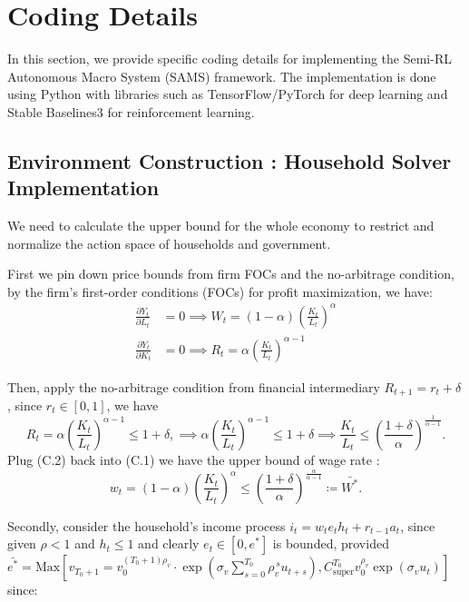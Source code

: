 \documentclass[11pt]{article}
\begin{document}
\section{Coding Details}

In this section, we provide specific coding details for implementing the Semi-RL Autonomous Macro System (SAMS) framework. The implementation is done using Python with libraries such as TensorFlow/PyTorch for deep learning and Stable Baselines3 for reinforcement learning.

\subsection{Environment Construction : Household Solver Implementation}

We need to calculate the upper bound for the whole economy to restrict and normalize the action space of households and government.

First we pin down price bounds from firm FOCs and the no-arbitrage condition, by the firm's first-order conditions (FOCs) for profit maximization, we have:
\begin{equation}
\begin{aligned}
\frac{\partial Y_t}{\partial L_t} &= 0 \implies W_t = (1 - \alpha) \left( \frac{K_t}{L_t} \right)^{\alpha} \\
\frac{\partial Y_t}{\partial K_t} &= 0 \implies R_t = \alpha \left( \frac{K_t}{L_t} \right)^{\alpha - 1}
\end{aligned}
\end{equation}

Then, apply the no-arbitrage condition from financial intermediary $R_{t+1} = r_t + \delta$, since $r_t \in [0,1]$, we have 
\begin{equation}
  R_{t} = \alpha \left( \frac{K_t}{L_t} \right)^{\alpha - 1} \le 1+\delta, 
  \implies \alpha \left( \frac{K_t}{L_t} \right)^{\alpha-1} \le 1+\delta 
  \implies \frac{K_t}{L_t} \le \left(\frac{1+\delta}{\alpha}\right)^{\frac{1}{\alpha-1}}.
\end{equation}
Plug (C.2) back into (C.1) we have the upper bound of wage rate :
\[
 w_t = (1 - \alpha) \left( \frac{K_t}{L_t} \right)^{\alpha} \leq \left( \frac{1+\delta}{\alpha} \right)^{\frac{\alpha}{\alpha-1}} \coloneqq \bar{W^*}.
\]

Secondly, consider the household's income process $i_t = w_t e_t h_t + r_{t-1} a_t$, since given $\rho<1$ and $h_t \leq 1$ and clearly $e_t \in [0, e^{*}]$ is bounded, provided 
$\bar{e^*} = \text{Max} \left[v_{T_0+1} = v_{0}^{(T_0+1)\rho_v} 
\cdot \exp\!\left(\sigma_v \sum_{s=0}^{T_0} \rho_v^{\,s} u_{t+s}\right), 
C_{\text{super}}^{T_0}v_{0}^{\rho_v} \exp\!\left(\sigma_v u_{t}\right)\right] $ since:
\end{document}
